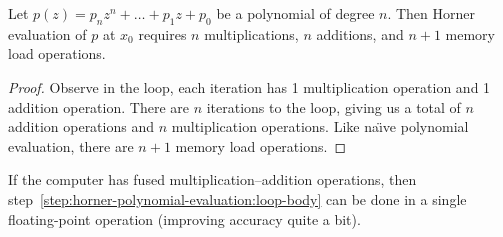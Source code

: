 \begin{thm}
  Let $p(z) = p_{n}z^{n} + \dots + p_{1}z + p_{0}$ be a polynomial of
  degree $n$. Then Horner evaluation of $p$ at $x_{0}$ requires $n$
  multiplications, $n$ additions, and $n+1$ memory load operations.
\end{thm}
\begin{proof}
Observe in the loop, each iteration has 1 multiplication operation and 1
addition operation. There are $n$ iterations to the loop, giving us a
total of $n$ addition operations and $n$ multiplication operations.
Like na\"{\i}ve polynomial evaluation, there are $n+1$ memory load
operations.
\end{proof}
\begin{rmk}
  If the computer has fused multiplication--addition operations, then
  step~\ref{step:horner-polynomial-evaluation:loop-body} can be done in
  a single floating-point operation (improving accuracy quite a bit).
\end{rmk}
